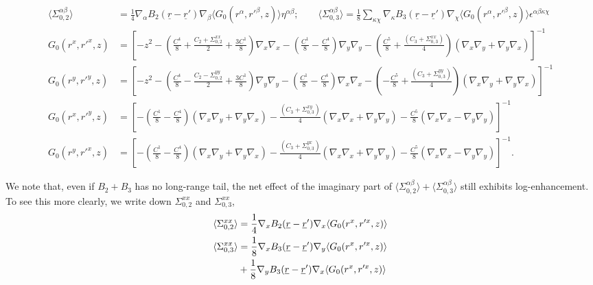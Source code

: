 \documentclass[twoside,twocolumn,9pt]{article}
\begin{document}
\begin{strip}
\begin{subequations}
\begin{align}
\langle\Sigma^{\alpha\beta}_{0,2}\rangle&=\frac{1}{4}\nabla_\alpha B_2(\underline{r}-\underline{r}')\nabla_\beta \langle G_0(r^\alpha,r'^\beta,z)\rangle\eta^{\alpha\beta};\qquad
\langle\Sigma^{\alpha\beta}_{0,3}\rangle=\frac{1}{8}\sum_{\kappa\chi}\nabla_\kappa B_3(\underline{r}-\underline{r}')\nabla_\chi \langle G_0(r^\alpha,r'^\beta,z)\rangle\epsilon^{\alpha\beta\kappa\chi}\\
G_0(r^x,r'^x,z)&=\left[-z^2-\left(\frac{C^4}{8}+\frac{C_2+\Sigma^{xx}_{0,2}}{2}+\frac{3C^1}{8}\right)\nabla_x\nabla_x-\left(\frac{C^1}{8}-\frac{C^4}{8}\right)\nabla_y\nabla_y
-\left(\frac{C^5}{8}+\frac{(C_3+\Sigma^{xx}_{0,3})}{4}\right)\left(\nabla_x\nabla_y+\nabla_y\nabla_x\right)\right]^{-1}\\
G_0(r^y,r'^y,z)&=\left[-z^2-\left(\frac{C^4}{8}-\frac{C_2-\Sigma^{yy}_{0,2}}{2}+\frac{3C^1}{8}\right)\nabla_y\nabla_y-\left(\frac{C^1}{8}-\frac{C^4}{8}\right)\nabla_x\nabla_x
-\left(-\frac{C^5}{8}+\frac{(C_3+\Sigma^{yy}_{0,3})}{4}\right)\left(\nabla_x\nabla_y+\nabla_y\nabla_x\right)\right]^{-1}\\
G_0(r^x,r'^y,z)&=\left[-\left(\frac{C^1}{8}-\frac{C^4}{8}\right)(\nabla_x\nabla_y+\nabla_y\nabla_x)-\frac{(C_3+\Sigma^{xy}_{0,3})}{4}(\nabla_x\nabla_x+\nabla_y\nabla_y)
-\frac{C^5}{8}(\nabla_x\nabla_x-\nabla_y\nabla_y)\right]^{-1}\\
G_0(r^y,r'^x,z)&=\left[-\left(\frac{C^1}{8}-\frac{C^4}{8}\right)(\nabla_x\nabla_y+\nabla_y\nabla_x)-\frac{(C_3+\Sigma^{yx}_{0,3})}{4}(\nabla_x\nabla_x+\nabla_y\nabla_y)
-\frac{C^5}{8}(\nabla_x\nabla_x-\nabla_y\nabla_y)\right]^{-1}.
\end{align}
\end{subequations}
\end{strip}
We note that, even if $B_2+B_3$ has no long-range tail, the net effect of the imaginary part of $\langle\Sigma^{\alpha\beta}_{0,2}\rangle+\langle\Sigma^{\alpha\beta}_{0,3}\rangle$ still exhibits log-enhancement. To see this more clearly, we write down $\Sigma_{0,2}^{xx}$ and $\Sigma_{0,3}^{xx}$,
\begin{align}
\langle\Sigma^{xx}_{0,2}\rangle&=\frac{1}{4}\nabla_x B_2(\underline{r}-\underline{r}')\nabla_x \langle G_0(r^x,r'^{x},z)\rangle\notag\\
\langle\Sigma^{xx}_{0,3}\rangle&=\frac{1}{8}\nabla_x B_3(\underline{r}-\underline{r}')\nabla_y \langle G_0(r^x,r'^x,z)\rangle\notag\\
&+\frac{1}{8}\nabla_y B_3(\underline{r}-\underline{r}')\nabla_x \langle G_0(r^x,r'^x,z)\rangle
\end{align}
\end{document}
